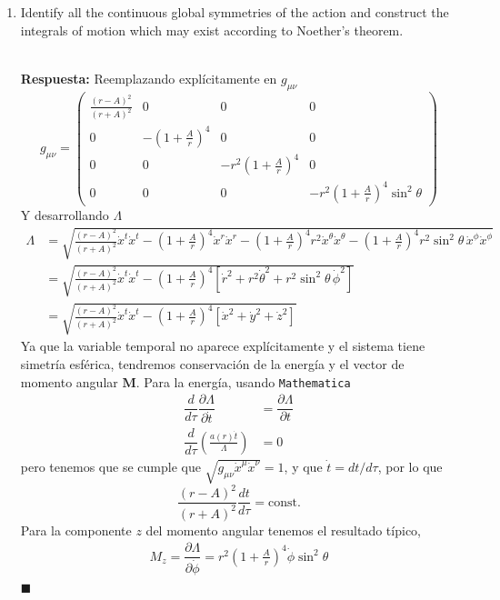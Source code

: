 \documentclass[]{article}
\numberwithin{equation}{section}
\newcommand{\0}{\textcolor{gray}{0}}
\newcommand{\pd}[2]{\dfrac{\partial #1}{\partial #2}}
\newcommand{\td}[2]{\dfrac{d #1}{d #2}}
\newcommand{\ltd}[2]{d #1/d #2}
\newcommand{\n}[1]{\mathbf{#1}}
\newcommand{\qed}{\hfill\(\blacksquare\)}
\newcommand{\resp}{
	\\
	
	\textbf{Respuesta:} }
\begin{document}
\begin{enumerate}
	\item[(a)] Identify all the continuous global symmetries of the action and construct the integrals of motion which may exist according to Noether's theorem.
	\resp Reemplazando explícitamente en $g_{\mu\nu}$
	\begin{equation*}
		g_{\mu\nu} = \begin{pmatrix}
			\frac{(r-A)^2}{(r + A)^2} & 0 & 0 & 0 \\
			0 & -\left(1 + \frac{A}{r}\right)^4 & 0 & 0 \\
			0 & 0 & - r^2 \left(1 + \frac{A}{r}\right)^4 & 0 \\
			0 & 0 & 0 & - r^2 \left(1 + \frac{A}{r}\right)^4 \sin^2 \theta
		\end{pmatrix}
	\end{equation*}
	Y desarrollando $\Lambda$
	\begin{align*}
		\Lambda &= \sqrt{\frac{(r-A)^2}{(r + A)^2} \dot{x}^{t}\dot{x}^{t} - \left(1 + \frac{A}{r}\right)^4 \dot{x}^{r}\dot{x}^{r} - \left(1 + \frac{A}{r}\right)^4 r^2 \dot{x}^{\theta}\dot{x}^{\theta} - \left(1 + \frac{A}{r}\right)^4 r^2 \sin^2 \theta \, \dot{x}^{\phi}\dot{x}^{\phi}}\\
		&= \sqrt{\frac{(r-A)^2}{(r + A)^2} \dot{x}^{t}\dot{x}^{t} - \left(1 + \frac{A}{r}\right)^4 \left[\dot{r}^2 + r^2 \dot{\theta}^2 + r^2 \sin^2 \theta \, \dot{\phi}^2 \right]}\\
		&= \sqrt{\frac{(r-A)^2}{(r + A)^2} \dot{x}^{t}\dot{x}^{t} - \left(1 + \frac{A}{r}\right)^4 \left[\dot{x}^2 + \dot{y}^2 + \dot{z}^2 \right]}
	\end{align*}
	Ya que la variable temporal no aparece explícitamente y el sistema tiene simetría esférica, tendremos conservación de la energía y el vector de momento angular $\n{M}$. Para la energía, usando \texttt{Mathematica}
	\begin{align*}
		\td{}{\tau} \pd{\Lambda}{\dot{t}} &= \pd{\Lambda}{t}\\
		\td{}{\tau} \left(\frac{a(r) \dot{t}}{\Lambda}\right) &= 0
	\end{align*}
	pero tenemos que se cumple que $\sqrt{g_{\mu\nu} \dot{x}^{\mu} \dot{x}^{\nu}} = 1$, y que $\dot{t} = \ltd{t}{\tau}$, por lo que
	\begin{equation*}
		\frac{(r - A)^2}{(r + A)^2} \td{t}{\tau} = \mathrm{const.}
	\end{equation*}
	Para la componente $z$ del momento angular tenemos el resultado típico,
	\begin{align}
		M_z = \pd{\Lambda}{\dot{\phi}} = r^2 \left(1 + \frac{A}{r}\right)^4 \dot{\phi} \sin^2\theta
	\end{align}
	\qed
	

\end{enumerate}
\end{document}
